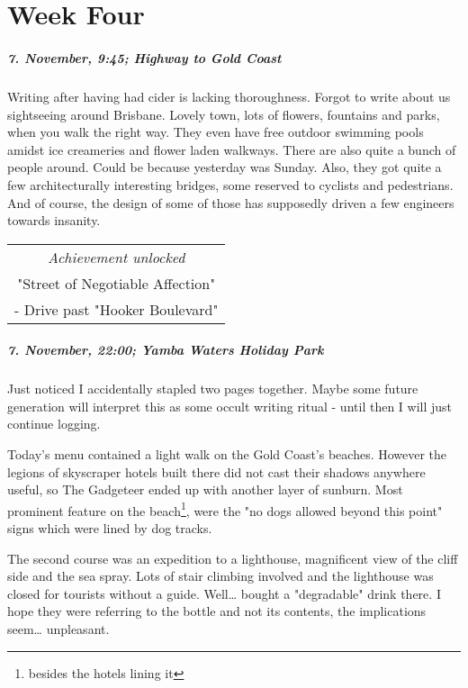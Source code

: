 \chapter{Week Four}


\paragraph{7. November, 9:45; Highway to Gold Coast}
Writing after having had cider is lacking thoroughness.
Forgot to write about us sightseeing around Brisbane.
Lovely town, lots of flowers, fountains and parks, when you walk the right way.
They even have free outdoor swimming pools amidst ice creameries and flower laden walkways.
There are also quite a bunch of people around.
Could be because yesterday was Sunday.
Also, they got quite a few architecturally interesting bridges, some reserved to cyclists and pedestrians.
And of course, the design of some of those has supposedly driven a few engineers towards insanity.

\begin{center}
\begin{tabular}{||c||}
\emph{Achievement unlocked}\\
"Street of Negotiable Affection"\\
\multicolumn{1}{||p{0.8\textwidth}||}{\footnotesize - Drive past "Hooker Boulevard"} \\
\end{tabular}
\end{center}

\paragraph{7. November, 22:00; Yamba Waters Holiday Park}
Just noticed I accidentally stapled two pages together.
Maybe some future generation will interpret this as some occult writing ritual - until then I will just continue logging.

Today's menu contained a light walk on the Gold Coast's beaches.
However the legions of skyscraper hotels built there did not cast their shadows anywhere useful, so The Gadgeteer ended up with another layer of sunburn.
Most prominent feature on the beach\footnote{besides the hotels lining it}, were the "no dogs allowed beyond this point" signs which were lined by dog tracks.

The second course was an expedition to a lighthouse, magnificent view of the cliff side and the sea spray.
Lots of stair climbing involved and the lighthouse was closed for tourists without a guide.
Well\ldots{} bought a "degradable" drink there.
I hope they were referring to the bottle and not its contents, the implications seem\ldots{} unpleasant.

